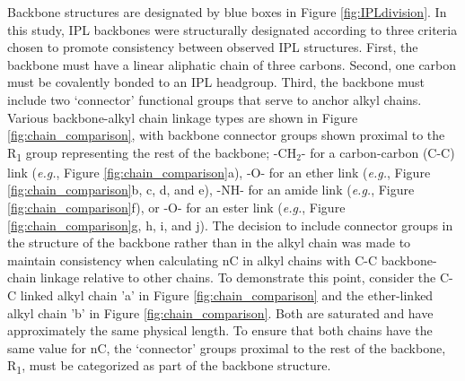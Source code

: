 Backbone structures are designated by blue boxes in Figure \ref{fig:IPLdivision}. In this study, IPL backbones were structurally designated according to three criteria chosen to promote consistency between observed IPL structures. First, the backbone must have a linear aliphatic chain of three carbons. Second, one carbon must be covalently bonded to an IPL headgroup. Third, the backbone must include two `connector' functional groups that serve to anchor alkyl chains. Various backbone-alkyl chain linkage types are shown in Figure \ref{fig:chain_comparison}, with backbone connector groups shown proximal to the R\textsubscript{1} group representing the rest of the backbone; -CH$_{2}$- for a carbon-carbon (C-C) link (\textit{e.g.}, Figure \ref{fig:chain_comparison}a), -O- for an ether link (\textit{e.g.}, Figure \ref{fig:chain_comparison}b, c, d, and e), -NH- for an amide link (\textit{e.g.}, Figure \ref{fig:chain_comparison}f), or -O- for an ester link (\textit{e.g.}, Figure \ref{fig:chain_comparison}g, h, i, and j). The decision to include connector groups in the structure of the backbone rather than in the alkyl chain was made to maintain consistency when calculating nC in alkyl chains with C-C backbone-chain linkage relative to other chains. To demonstrate this point, consider the C-C linked alkyl chain 'a' in Figure \ref{fig:chain_comparison} and the ether-linked alkyl chain 'b' in Figure \ref{fig:chain_comparison}. Both are saturated and have approximately the same physical length. To ensure that both chains have the same value for nC, the `connector' groups proximal to the rest of the backbone, R\textsubscript{1}, must be categorized as part of the backbone structure.

